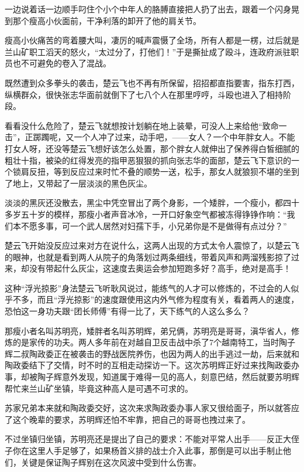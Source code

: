 一边说着话一边顺手叼住个小个中年人的胳膊直接把人扔了出去，跟着一个闪身晃到那个瘦高小伙面前，干净利落的卸开了他的肩关节。

瘦高小伙痛苦的弯着腰大叫，凄厉的喊声震慑了全场，所有人都是一楞，过后就是兰山矿职工滔天的怒火，“太过分了，打他们！”于是撕扯成了殴斗，连政府派驻职员也不可避免的卷入了混战。

既然遭到众多拳头的袭击，楚云飞也不再有所保留，招招都直指要害，指东打西，纵横群众，很快张志华面前就倒下了七八个人在那里哼哼，斗殴也进入了相持阶段。

看看没什么危险了，楚云飞就想按计划躺在地上装晕，可没人上来给他“致命一击”，正踯躅呢，又一个人冲了过来，动手吧，——女人？一个中年胖女人。不能打女人呀，还没等楚云飞想好该怎么处置，那个胖女人就伸出了保养得白皙细腻的粗壮十指，被染的红得发亮的指甲恶狠狠的抓向张志华的面部，楚云飞下意识的一个锁肩反扭，等到反应过来时忙不叠的顺势一送，松手，那女人就狼狈不堪的坐到了地上，又带起了一层淡淡的黑色灰尘。

淡淡的黑灰还没散去，黑尘中凭空冒出了两个身影，一个矮胖，一个瘦小，都四十多岁五十岁的模样，那瘦小者声音冰冷，一开口好象空气都被冻得铮铮作响：“我们本不愿多事，可一个武人居然对妇孺下手，小兄弟你是不是做得有点过分？”

楚云飞开始没反应过来对方在说什么，这两人出现的方式太令人震惊了，以楚云飞的眼神，也就是看到两人从院子的角落划过两条细线，带着风声和两溜残影掠了过来，却没有带起什么灰尘，这速度去奥运会参加短跑多好？高手，绝对是高手！

这种“浮光掠影”身法楚云飞听耿风说过，能练气的人才可以修炼的，不过会的人似乎不多，而且“浮光掠影”的速度跟使用这内外气修为程度有关，看着两人的速度，恐怕这一身功夫跟“团长师傅”有得一比了，天下练气的人这么多么？

那瘦小者名叫苏明亮，矮胖者名叫苏明辉，弟兄俩，苏明亮是哥哥，滇华省人，修炼的是家传的功夫。两人多年前在对越自卫反击战中杀了7个越南特工，当时陶子辉二叔陶政委正在被袭击的野战医院养伤，也因为两人的出手逃过一劫，后来就和陶政委结下了交情，时不时的互相走动探访一下。这次苏明辉正好过来找陶政委办事，却被陶子辉意外发现，知道属于难得一见的高人，刻意巴结，然后就要苏明辉帮忙来兰山矿坐镇，毕竟这种高人是可遇不可求的。

苏家兄弟本来就和陶政委交好，这次来求陶政委办事人家又很给面子，所以就答应了这个晚辈的要求，苏明辉还怕不牢靠，把自己的哥哥也拽过来了。

不过坐镇归坐镇，苏明亮还是提出了自己的要求：不能对平常人出手——反正大侄子你在这里人手足够了，如果杨首义排的战士介入此事，那倒是可以出手制止他们，关键是保证陶子辉别在这次风波中受到什么伤害。

